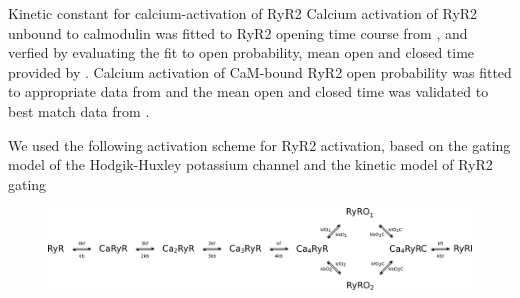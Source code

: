\documentclass[9pt,lineno]{elife}
\begin{document}
Kinetic constant for calcium-activation of RyR2 Calcium activation of RyR2 unbound to calmodulin was fitted to RyR2 opening time course from \citep{ca_stoichiometry_ryr}, and verfied by evaluating the fit to open probability, mean open and closed time provided by \citep{xu_meissner_2004}. Calcium activation of CaM-bound RyR2 open probability was fitted to appropriate data from \citep{xu_meissner_2004} and the mean open and closed time was validated to best match data from \citep{xu_meissner_2004}.

We used the following activation scheme for RyR2 activation, based on the gating model of the Hodgik-Huxley potassium channel \citep{johnston_wu} and the kinetic model of RyR2 gating \citep{Zahradnikova_kon,ca_stoichiometry_ryr}
\begin{figure}
\includegraphics[width=0.95\linewidth]{RyR_Ca_activation_scheme.png}
\caption{\label{fig:RyR2activation}}
\end{figure}







\end{document}
